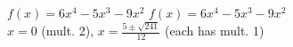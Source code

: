 {$f(x) = 6x^{4} - 5x^{3} - 9x^{2}$}
{$f(x) = 6x^{4} - 5x^{3} - 9x^{2}$ \\ $x = 0$ (mult. 2), $x = \frac{5 \pm \sqrt{241}}{12}$ (each has mult. 1)}